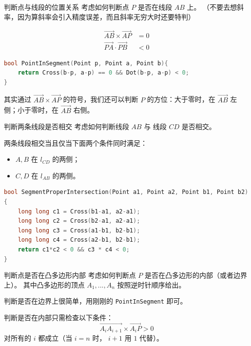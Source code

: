 \documentclass{beamer}
\begin{document}
\begin{frame}[fragile]{判断点与线段的位置关系}
    \small
    考虑如何判断点 $P$ 是否在线段 $AB$ 上。
    （不要去想斜率，因为算斜率会引入精度误差，而且斜率无穷大时还要特判）

    \vspace{1em}\pause
    \begin{align}
        \overrightarrow{AB}\times  \overrightarrow{AP}&=0\\
        \overrightarrow{PA}\cdot  \overrightarrow{PB}&<0
    \end{align}

    \vspace{1em}\pause
    \begin{lstlisting}[language=c++]
bool PointInSegment(Point p, Point a, Point b){
    return Cross(b-p, a-p) == 0 && Dot(b-p, a-p) < 0;
}
    \end{lstlisting}

    \vspace{1em}\pause
    其实通过 $\overrightarrow{AB}\times  \overrightarrow{AP}$
    的符号，我们还可以判断 $P$ 的方位：大于零时，在 $\overrightarrow{AB}$
    左侧；小于零时，在 $\overrightarrow{AB}$ 右侧。
\end{frame}

\begin{frame}[fragile]{判断两条线段是否相交}
    \small
    考虑如何判断线段 $AB$ 与 线段 $CD$ 是否相交。

    \vspace{1em}\pause
    两条线段相交当且仅当下面两个条件同时满足：
    \begin{itemize}
        \item $A,B$ 在 $l_{CD}$ 的两侧；
        \item $C,D$ 在 $l_{AB}$ 的两侧。
    \end{itemize}

    \vspace{1em}\pause
    \begin{lstlisting}[language=c++]
bool SegmentProperIntersection(Point a1, Point a2, Point b1, Point b2)
{
    long long c1 = Cross(b1-a1, a2-a1);
    long long c2 = Cross(b2-a1, a2-a1);
    long long c3 = Cross(a1-b1, b2-b1);
    long long c4 = Cross(a2-b1, b2-b1);
    return c1*c2 < 0 && c3 * c4 < 0;
}
    \end{lstlisting}
\end{frame}

\begin{frame}[fragile]{判断点是否在凸多边形内部}
    \small
    考虑如何判断点 $P$ 是否在凸多边形的内部（或者边界上）。
    其中凸多边形的顶点 $A_1,...,A_n$ 按照逆时针顺序给出。

    \vspace{1em}\pause
    判断是否在边界上很简单，用刚刚的 \verb|PointInSegment| 即可。

    \vspace{1em}\pause
    判断是否在内部只需检查以下条件：
    \begin{equation}
        \overrightarrow{A_iA_{i+1}}\times  \overrightarrow{A_iP}>0
    \end{equation}
    对所有的 $i$ 都成立（当 $i=n$ 时， $i+1$ 用 $1$ 代替）。
\end{frame}
\end{document}
